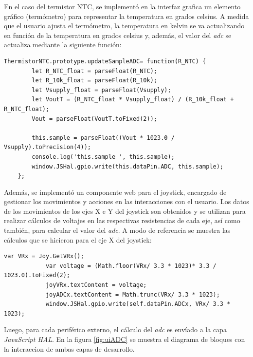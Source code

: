 En el caso del termistor NTC, se implementó en la interfaz grafica un elemento gráfico (termómetro) para representar la temperatura en grados celsius. A medida que el usuario ajusta el termómetro, la temperatura en kelvin se va actualizando en función de la temperatura en grados celsius y, además, el valor del \textit{adc} se actualiza mediante la siguiente función:

\begin{lstlisting}[caption={Cálculo ADC del termistor NTC.}]
     ThermistorNTC.prototype.updateSampleADC= function(R_NTC) {
        let R_NTC_float = parseFloat(R_NTC);
        let R_10k_float = parseFloat(R_10k);
        let Vsupply_float = parseFloat(Vsupply);    
        let VoutT = (R_NTC_float * Vsupply_float) / (R_10k_float + R_NTC_float);
        Vout = parseFloat(VoutT.toFixed(2)); 

        this.sample = parseFloat((Vout * 1023.0 / Vsupply).toPrecision(4));
        console.log('this.sample ', this.sample);
        window.JSHal.gpio.write(this.dataPin.ADC, this.sample);     
    };
\end{lstlisting}

Además, se implementó un componente web para el joystick, encargado de gestionar los movimientos y acciones en las interacciones con el usuario. Los datos de los movimientos de los ejes X e Y del joystick son obtenidos y se utilizan para realizar cálculos de voltajes en las respectivas resistencias de cada eje, así como también, para calcular el valor del \textit{adc}. A modo de referencia se muestra las cálculos que se hicieron para el eje X del joystick:

\begin{lstlisting}[caption={Cálculo de la resistencia del eje X y del ADC.}]
            var VRx = Joy.GetVRx();
            var voltage = (Math.floor(VRx/ 3.3 * 1023)* 3.3 / 1023.0).toFixed(2);
            joyVRx.textContent = voltage;
            joyADCx.textContent = Math.trunc(VRx/ 3.3 * 1023);
            window.JSHal.gpio.write(self.dataPin.ADCx, VRx/ 3.3 * 1023);
\end{lstlisting}

Luego, para cada periférico externo, el cálculo del \textit{adc} es envíado a la capa \textit{JavaScript HAL}.
En la figura \ref{fig:uiADC} se muestra el diagrama de bloques con la interaccion de ambas capas de desarrollo.

\hfill \break
\hfill \break
\hfill \break

